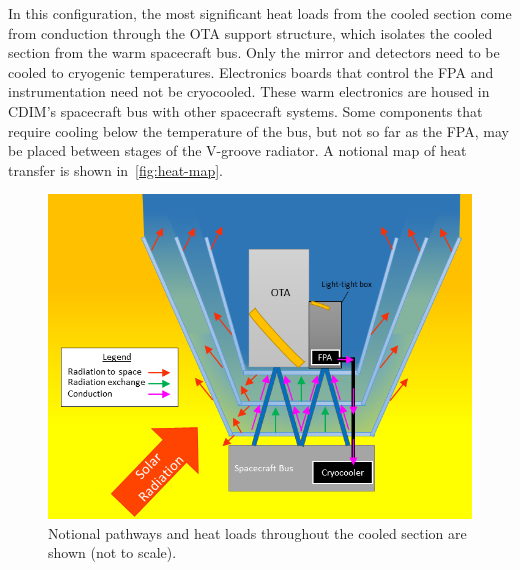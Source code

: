 \documentclass{ws-jai}
\begin{document}
In this configuration, the most significant heat loads from the cooled section come from conduction through the OTA support structure, which isolates the cooled section from the warm spacecraft bus.
Only the mirror and detectors need to be cooled to cryogenic temperatures.
Electronics boards that control the FPA and instrumentation need not be cryocooled.
These warm electronics are housed in CDIM's spacecraft bus with other spacecraft systems.
Some components that require cooling below the temperature of the bus, but not so far as the FPA, may be placed between stages of the V-groove radiator.
A notional map of heat transfer is shown in~\autoref{fig:heat-map}.

\begin{figure}[!ht]
  \centering
  \includegraphics[width=.8\linewidth]{figs/heat-map.png}
  \caption{Notional pathways and heat loads throughout the cooled section are shown (not to scale).
\label{fig:heat-map}
}
\end{figure}



\end{document}
